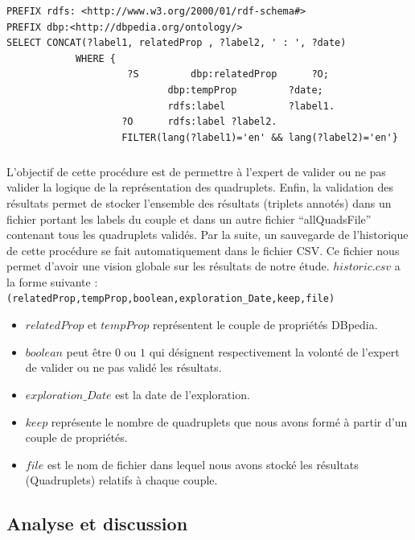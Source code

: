 \begin{verbatim}
PREFIX rdfs: <http://www.w3.org/2000/01/rdf-schema#> 
PREFIX dbp:<http://dbpedia.org/ontology/> 
SELECT CONCAT(?label1, relatedProp , ?label2, ' : ', ?date) 
			WHERE {  
					 ?S   		dbp:relatedProp 	 ?O;
							dbp:tempProp		 ?date;
							rdfs:label 			 ?label1.
					?O 		rdfs:label ?label2.
					FILTER(lang(?label1)='en' && lang(?label2)='en'}
\end{verbatim}
\subparagraph{}
L'objectif de cette procédure est de permettre à l'expert de valider ou ne pas valider la logique de la représentation des quadruplets. Enfin, la validation des résultats permet de stocker l'ensemble des résultats (triplets annotés) dans un fichier portant les labels du couple et dans un autre fichier ``allQuadsFile'' contenant tous les quadruplets validés. Par la suite, un sauvegarde de l'historique de cette procédure se fait automatiquement dans le fichier CSV. Ce fichier nous permet d'avoir une vision globale sur les résultats de notre étude. $historic.csv$ a la forme suivante :
\newline
{\tt (relatedProp,tempProp,boolean,exploration\_Date,keep,file)} 
\begin{itemize}
\item $relatedProp$ et $tempProp$ représentent le couple de propriétés DBpedia.
\item $boolean$ peut être $0$ ou $1$ qui désignent respectivement la volonté de l'expert de valider ou ne pas validé les résultats.
\item $exploration\_Date$ est la date de l'exploration.
\item $keep$ représente le nombre de quadruplets que nous avons formé à partir d'un couple de propriétés.
\item $file$ est le nom de fichier dans lequel nous avons stocké les résultats (Quadruplets) relatifs à chaque couple.
\end{itemize}
\newpage
\subsection{Analyse et discussion}
